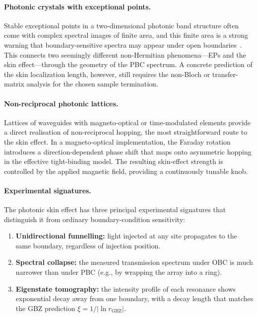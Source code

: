 \paragraph{Photonic crystals with exceptional points.}
Stable exceptional points in a two-dimensional photonic band structure
often come with complex spectral images of finite area, and this finite
area is a strong warning that boundary-sensitive spectra may appear
under open boundaries~\cite{zhang2022universal}. This connects two
seemingly different non-Hermitian phenomena---EPs and the skin
effect---through the geometry of the PBC spectrum. A concrete prediction
of the skin localization length, however, still requires the non-Bloch
or transfer-matrix analysis for the chosen sample termination.

\paragraph{Non-reciprocal photonic lattices.}
Lattices of waveguides with magneto-optical or time-modulated elements
provide a direct realisation of non-reciprocal hopping, the most
straightforward route to the skin effect. In a magneto-optical
implementation, the Faraday rotation introduces a direction-dependent
phase shift that maps onto asymmetric hopping in the effective
tight-binding model. The resulting skin-effect strength is controlled
by the applied magnetic field, providing a continuously tunable knob.

\paragraph{Experimental signatures.}
The photonic skin effect has three principal experimental signatures
that distinguish it from ordinary boundary-condition sensitivity:
\begin{enumerate}
 \item \textbf{Unidirectional funnelling:} light injected at any site
 propagates to the same boundary, regardless of injection position.
 \item \textbf{Spectral collapse:} the measured transmission spectrum
 under OBC is much narrower than under PBC (e.g., by
 wrapping the array into a ring).
 \item \textbf{Eigenstate tomography:} the intensity profile of each
 resonance shows exponential decay away from one boundary, with a
 decay length that matches the GBZ prediction $\xi = 1/|\ln r_{\mathrm{GBZ}}|$.
\end{enumerate}

